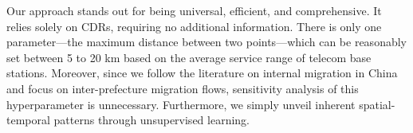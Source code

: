Our approach stands out for being universal, efficient, and comprehensive.
It relies solely on CDRs, requiring no additional information.
There is only one parameter—the maximum distance between two points—which can be reasonably set between 5 to 20 km based on the average service range of telecom base stations.
Moreover, since we follow the literature on internal migration in China and focus on inter-prefecture migration flows, sensitivity analysis of this hyperparameter is unnecessary.
Furthermore, we simply unveil inherent spatial-temporal patterns through unsupervised learning.
